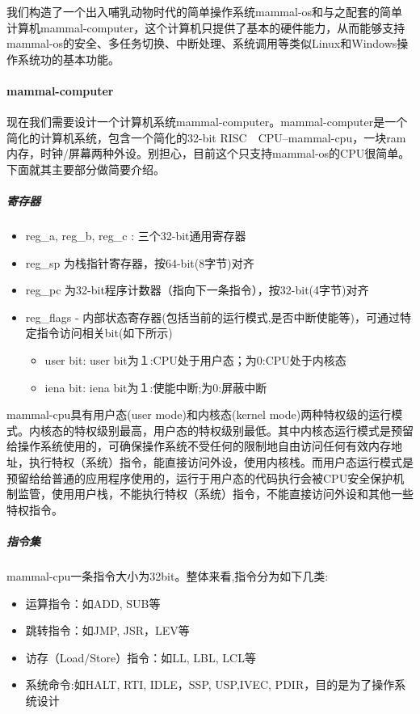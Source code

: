 我们构造了一个出入哺乳动物时代的简单操作系统mammal-os和与之配套的简单计算机mammal-computer，这个计算机只提供了基本的硬件能力，从而能够支持mammal-os的安全、多任务切换、中断处理、系统调用等类似Linux和Windows操作系统功的基本功能。

\paragraph{mammal-computer}
现在我们需要设计一个计算机系统mammal-computer。mammal-computer是一个简化的计算机系统，包含一个简化的32-bit RISC　CPU--mammal-cpu，一块ram内存，时钟/屏幕两种外设。别担心，目前这个只支持mammal-os的CPU很简单。下面就其主要部分做简要介绍。

\subparagraph{寄存器}

\begin{itemize}
	\item reg\_a, reg\_b, reg\_c : 三个32-bit通用寄存器
	\item reg\_sp 为栈指针寄存器，按64-bit(8字节)对齐
	\item reg\_pc 为32-bit程序计数器（指向下一条指令），按32-bit(4字节)对齐
	\item reg\_flags - 内部状态寄存器(包括当前的运行模式,是否中断使能等)，可通过特定指令访问相关bit(如下所示)	
	\begin{itemize}
      \item  user bit: user bit为１:CPU处于用户态；为0:CPU处于内核态
      \item  iena bit: iena bit为１:使能中断;为0:屏蔽中断		
	\end{itemize}
\end{itemize}

mammal-cpu具有用户态(user mode)和内核态(kernel mode)两种特权级的运行模式。内核态的特权级别最高，用户态的特权级别最低。其中内核态运行模式是预留给操作系统使用的，可确保操作系统不受任何的限制地自由访问任何有效内存地址，执行特权（系统）指令，能直接访问外设，使用内核栈。而用户态运行模式是预留给给普通的应用程序使用的，运行于用户态的代码执行会被CPU安全保护机制监管，使用用户栈，不能执行特权（系统）指令，不能直接访问外设和其他一些特权指令。

\subparagraph{指令集}
mammal-cpu一条指令大小为32bit。整体来看,指令分为如下几类:
\begin{itemize}
\item 运算指令：如ADD, SUB等
\item 跳转指令：如JMP, JSR，LEV等
\item 访存（Load/Store）指令：如LL, LBL, LCL等
\item 系统命令:如HALT, RTI, IDLE，SSP, USP,IVEC, PDIR，目的是为了操作系统设计
\end{itemize}

